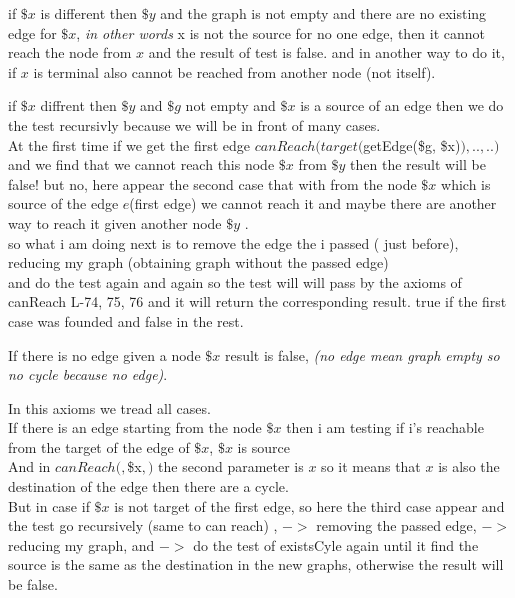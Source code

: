 \bigskip\noindent

if $\$x$ is different then $\$y$ and the graph is not empty and there are no existing edge for $\$x$, \textit{in other words} x is not the source for no one edge, then it cannot reach the node from $x$ and the result of test is false.
and in another way to do it, if $x$ is terminal also cannot be reached from another node (not itself).
\bigskip\noindent

if $\$x$ diffrent then $\$y$ and $\$g$ not empty and $\$x$ is a source of an edge then we do the test recursivly because we will be in front of many cases.\\
At the first time if we get the first edge $canReach(target($getEdge(\$g, \$x)$), .., ..)$ and we find that we cannot reach this node $\$x$ from $\$y$ then the result will be false! but no, here appear the second case that with from the node $\$x$ which is source of the edge $e$(first edge) we cannot reach it and maybe there are another way to reach it given another node $\$y$ .\\
so what i am doing next is to remove the edge the i passed ( just before), reducing my graph (obtaining graph without the passed edge) \\
and do the test again and again so the test will will pass by the axioms of canReach L-74, 75, 76 and it will return the corresponding result. true if the first case was founded and false in the rest.

\bigskip\noindent

If there is no edge given a node $\$x$ result is false, \textit{(no edge mean graph empty  so no cycle because no edge)}.
\bigskip\noindent

In this axioms we tread all cases.\\
If there is an edge starting from the node $\$x$ then i am testing if i's reachable from the target of the edge of $\$x$, $\$x$ is source\\
And in $canReach(,$\$x$,)$ the second parameter is $x$ so it means that $x$ is also the destination of the edge then there are a cycle. \\ 
But in case if $\$x$ is not target of the first edge, so here the third case appear and the test go recursively (same to can reach) , $->$ removing the passed edge, $->$reducing my graph, and $->$ do the test of existsCyle again until it find the source is the same as the destination in the new graphs, otherwise the result will be false.



